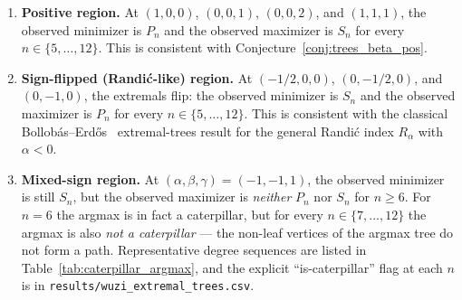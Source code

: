 \documentclass[11pt,a4paper]{article}
\theoremstyle{definition}
\begin{document}
\begin{enumerate}[label=(\alph*)]
\item \textbf{Positive region.} At $(1, 0, 0)$, $(0, 0, 1)$,
$(0, 0, 2)$, and $(1, 1, 1)$, the observed minimizer is $P_n$ and
the observed maximizer is $S_n$ for every $n \in \{5, \ldots, 12\}$.
This is consistent with Conjecture~\ref{conj:trees_beta_pos}.

\item \textbf{Sign-flipped (Randi\'c-like) region.} At
$(-1/2, 0, 0)$, $(0, -1/2, 0)$, and $(0, -1, 0)$, the extremals
flip: the observed minimizer is $S_n$ and the observed maximizer
is $P_n$ for every $n \in \{5, \ldots, 12\}$. This is consistent
with the classical Bollob\'as--Erd\H{o}s~\cite{BollobasErdos1998} extremal-trees result for
the general Randi\'c index $R_\alpha$ with $\alpha < 0$.

\item \textbf{Mixed-sign region.} At $(\alpha, \beta, \gamma) = (-1, -1, 1)$,
the observed minimizer is still $S_n$, but the observed maximizer
is \emph{neither} $P_n$ nor $S_n$ for $n \ge 6$. For $n = 6$ the
argmax is in fact a caterpillar, but for every $n \in \{7, \ldots, 12\}$
the argmax is also \emph{not a caterpillar} --- the non-leaf
vertices of the argmax tree do not form a path. Representative
degree sequences are listed in
Table~\ref{tab:caterpillar_argmax}, and the explicit
``is-caterpillar'' flag at each $n$ is in
\texttt{results/wuzi\_extremal\_trees.csv}.
\end{enumerate}
\end{document}
